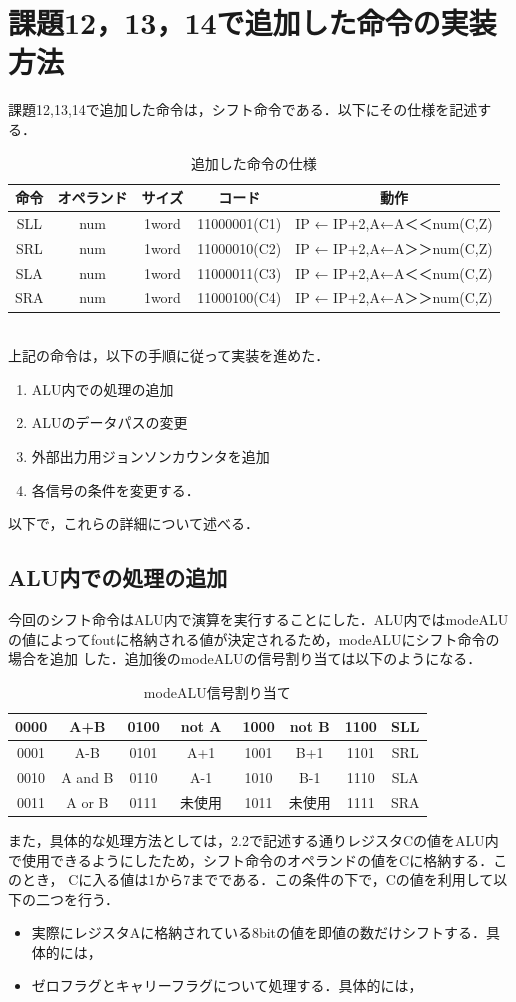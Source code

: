 \documentclass[dvipdfmx]{jarticle}
\begin{document}
\section{課題12，13，14で追加した命令の実装方法}
課題12,13,14で追加した命令は，シフト命令である．以下にその仕様を記述する．
\begin{table}[h]
  \centering
  \begin{tabular}{|c|c|c|c|c|}
    \hline
    命令 & オペランド & サイズ & コード & 動作\\\hline\hline
    SLL & num & 1word & 11000001(C1) & IP ← IP+2,A←A＜＜num(C,Z)\\\hline
    SRL & num & 1word & 11000010(C2) & IP ← IP+2,A←A＞＞num(C,Z)\\\hline
    SLA & num & 1word & 11000011(C3) & IP ← IP+2,A←A＜＜num(C,Z)\\\hline
    SRA & num & 1word & 11000100(C4) & IP ← IP+2,A←A＞＞num(C,Z)\\\hline
  \end{tabular}
  \caption{追加した命令の仕様}
\end{table}
\\上記の命令は，以下の手順に従って実装を進めた．
\begin{enumerate}
  \item ALU内での処理の追加
  \item ALUのデータパスの変更
  \item 外部出力用ジョンソンカウンタを追加
  \item 各信号の条件を変更する．
\end{enumerate}
以下で，これらの詳細について述べる．
\subsection{ALU内での処理の追加}
今回のシフト命令はALU内で演算を実行することにした．ALU内ではmodeALUの値によってfoutに格納される値が決定されるため，modeALUにシフト命令の場合を追加
した．追加後のmodeALUの信号割り当ては以下のようになる．\clearpage
\begin{table}[h]
  \centering
  \begin{tabular}{|c|c||c|c||c|c||c|c|}
    \hline
    0000 & A+B     & 0100 & not A　& 1000 & not B & 1100 & SLL\\\hline
    0001 & A-B     & 0101 & A+1    & 1001 & B+1   & 1101 & SRL\\\hline
    0010 & A and B & 0110 & A-1    & 1010 & B-1   & 1110 & SLA\\\hline
    0011 & A or B  & 0111 & 未使用 & 1011 & 未使用 & 1111 & SRA\\\hline
  \end{tabular}
  \caption{modeALU信号割り当て}
\end{table}
また，具体的な処理方法としては，2.2で記述する通りレジスタCの値をALU内で使用できるようにしたため，シフト命令のオペランドの値をCに格納する．このとき，
Cに入る値は1から7までである．この条件の下で，Cの値を利用して以下の二つを行う．
\begin{itemize}
  \item 実際にレジスタAに格納されている8bitの値を即値の数だけシフトする．具体的には，
  \item ゼロフラグとキャリーフラグについて処理する．具体的には，
\end{itemize}
\end{document}
